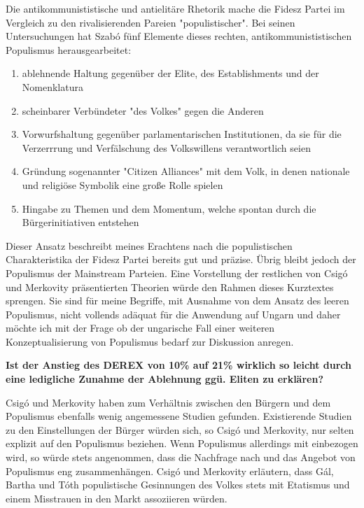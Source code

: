 \documentclass[11pt]{report}
\begin{document}
Die antikommunististische und antielitäre Rhetorik mache die Fidesz Partei im Vergleich zu den rivalisierenden Pareien "populistischer". Bei seinen Untersuchungen hat Szabó fünf Elemente dieses rechten, antikommunististischen Populismus herausgearbeitet:
\begin{enumerate}
\item ablehnende Haltung gegenüber der Elite, des Establishments und der Nomenklatura
\item scheinbarer Verbündeter "des Volkes" gegen die Anderen
\item Vorwurfshaltung gegenüber parlamentarischen Institutionen, da sie für die Verzerrrung und Verfälschung des Volkswillens verantwortlich seien
\item Gründung sogenannter "Citizen Alliances" mit dem Volk, in denen nationale und religiöse Symbolik eine große Rolle spielen
\item Hingabe zu Themen und dem Momentum, welche spontan durch die Bürgerinitiativen entstehen
\end{enumerate}

Dieser Ansatz beschreibt meines Erachtens nach die populistischen Charakteristika der Fidesz Partei bereits gut und präzise. Übrig bleibt jedoch der Populismus der Mainstream Parteien.
Eine Vorstellung der restlichen von Csigó und Merkovity präsentierten Theorien würde den Rahmen dieses Kurztextes sprengen. Sie sind für meine Begriffe, mit Ausnahme von dem Ansatz des leeren Populismus, nicht vollends adäquat für die Anwendung auf Ungarn und daher möchte ich mit der Frage ob der ungarische Fall einer weiteren Konzeptualisierung von Populismus bedarf zur Diskussion anregen.\newline


\Large \textbf{Ist der Anstieg des DEREX von 10\% auf 21\% wirklich so leicht durch eine ledigliche Zunahme der Ablehnung ggü. Eliten zu erklären?}

\normalsize
Csigó und Merkovity haben zum Verhältnis zwischen den Bürgern und dem Populismus ebenfalls wenig angemessene Studien gefunden. Existierende Studien zu den Einstellungen der Bürger würden sich, so Csigó und Merkovity, nur selten explizit auf den Populismus beziehen. Wenn Populismus allerdings mit einbezogen wird, so würde stets angenommen, dass die Nachfrage nach und das Angebot von Populismus eng zusammenhängen. Csigó und Merkovity erläutern, dass Gál, Bartha und Tóth populistische Gesinnungen des Volkes stets mit Etatismus und einem Misstrauen in den Markt assoziieren würden.
\end{document}
